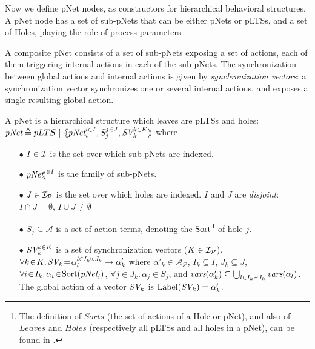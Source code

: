 \documentclass{lncs/llncs}
\def\AlgA{\mathcal{A}}
\renewcommand{\P}{\mathcal P}
\begin{document}
Now we define
pNet nodes, as constructors for hierarchical behavioral structures.
A pNet node has a set of sub-pNets that can be either pNets or pLTSs, and a
set of Holes, playing the role of process parameters.

A composite pNet consists of a set of sub-pNets exposing
a set of actions, each of them triggering internal actions in each of
the sub-pNets. The synchronization between global actions and
internal actions is given by  \emph{synchronization vectors}: a
synchronization vector synchronizes one or several internal actions, and
exposes a single resulting global action.


\begin{definition}[pNets]\label{def-pnets}
A pNet is a hierarchical structure which leaves are pLTSs and holes:\\
$\pNet\triangleq pLTS~|~\mylangle \pNet_i^{i\in I}, S_j^{j\in J}, \symb{SV}_k^{k\in K}\myrangle$
where
\begin{itemize}
\item[$\bullet$] $I \in \mathcal{I}$ is the set over which sub-pNets are indexed.
\item[$\bullet$] $\pNet_i^{i\in I}$ is the family of sub-pNets.

\item[$\bullet$] $J\in\I_\P$ is the set over which holes are indexed.
$I$ and $J$ are \emph{disjoint}: $I\cap J=\emptyset$,  $I\cup J\neq\emptyset$

\item[$\bullet$] $S_j \subseteq \AlgA$ is a set of action terms,
  denoting the $\operatorname{Sort}$\footnote{The definition of $Sorts$ (the
    set of actions of a Hole  
  or pNet), and also of $Leaves$ and $Holes$ (respectively all pLTSs
  and all holes in a pNet), can be found in \cite{henrio:Forte2016}.}
  of hole $j$. 

\item[$\bullet$] $\symb{SV}_k^{k\in K}$ is a set of
  synchronization vectors ($K\in\I_\P$). $\forall k\!\in\! K,
  \symb{SV}_k\!=\!\alpha_{l}^{l\in I_k \uplus J_k}\to\alpha'_k$ where
  $\alpha'_k\in \mathcal{A}_\P$, $I_k\subseteq I$, $J_k\subseteq J$,
  $\forall i\!\in\! I_k.\,\alpha_{i}\!\in\!\Sort(\pNet_i)$,
  $\forall j\!\in\!
  J_k.\,\alpha_{j}\!\in\!S_j$, and $\vars(\alpha'_k)\subseteq \bigcup_{l\in I_k\uplus 
  J_k}{\vars({\alpha_l})}$. The global action of a vector $\symb{SV}_k$ is
$\Label(\symb{SV}_k) = \alpha'_k$.


\end{itemize}
\end{definition}
\end{document}
